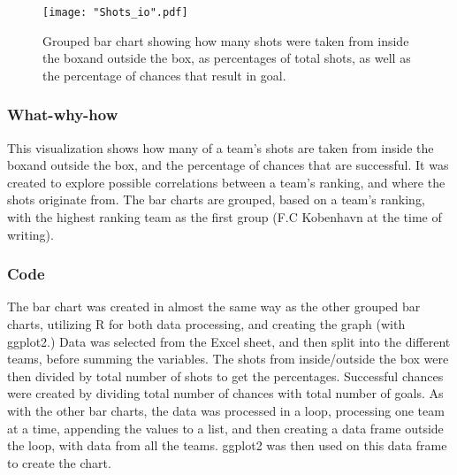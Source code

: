 \documentclass[Report.tex]{subfiles}
\begin{document}
\begin{figure}
\center
\texttt{[image: "Shots\_io".pdf]}
\caption{Grouped bar chart showing how many shots were taken from inside the
boxand outside the box, as percentages of total shots, as well as the
percentage of chances that result in goal.}
\label{Fig:Shots_IO} 
\end{figure}

\subsubsection{What-why-how}
This visualization shows how many of a team's shots are taken from inside the
boxand outside the box, and the percentage of chances that are successful.
It was created to explore possible correlations between a team's ranking, and
where the shots originate from. 
The bar charts are grouped, based on a team's ranking, with the highest ranking
team as the first group (F.C Kobenhavn at the time of writing). 

\subsubsection{Code}
The bar chart was created in almost the same way as the other grouped bar
charts, utilizing R for both data processing, and creating the graph (with
ggplot2.)
Data was selected from the Excel sheet, and then split into the different teams,
before summing the variables. The shots from inside/outside the box were then
divided by total number of shots to get the percentages. Successful chances were
created by dividing total number of chances with total number of goals.
As with the other bar charts, the data was processed in a loop, processing one
team at a time, appending the values to a list, and then creating a data frame
outside the loop, with data from all the teams. ggplot2 was then used on this
data frame to create the chart.
\end{document}
